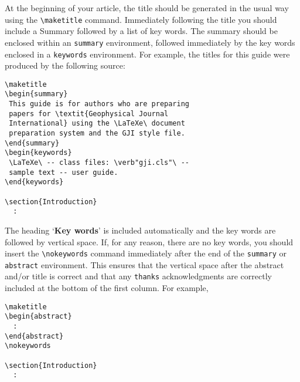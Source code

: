 \documentclass{gji}
\begin{document}
At the beginning of your article, the title should be generated in the
usual way using the \verb"\maketitle" command. Immediately following
the title you should include a Summary followed by a list of key
words. The summary should be enclosed within an \verb"summary"
environment, followed immediately by the key words enclosed in a
\verb"keywords" environment. For example, the titles for this guide
were produced by the following source:
\begin{verbatim}
\maketitle
\begin{summary}
 This guide is for authors who are preparing
 papers for \textit{Geophysical Journal
 International} using the \LaTeXe\ document
 preparation system and the GJI style file.
\end{summary}
\begin{keywords}
 \LaTeXe\ -- class files: \verb"gji.cls"\ --
 sample text -- user guide.
\end{keywords}

\section{Introduction}
  :
\end{verbatim}
The heading `\textbf{Key words}' is included automatically and the key
words are followed by vertical space. If, for any reason, there are no
key words, you should insert the \verb"\nokeywords" command immediately
after the end of the \verb"summary" or \verb"abstract" environment. This
ensures that the   vertical space after the abstract and/or title is
correct and that any
\verb"thanks" acknowledgments are correctly included at the bottom of
the first column. For example,
\begin{verbatim}
\maketitle
\begin{abstract}
  :
\end{abstract}
\nokeywords

\section{Introduction}
  :
\end{verbatim}
\end{document}
